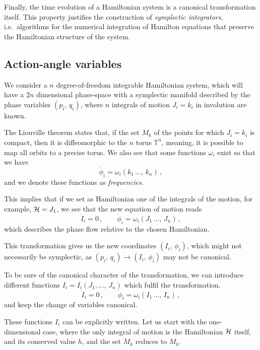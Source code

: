 Finally, the time evolution of a Hamiltonian system is a canonical transformation itself. This property justifies the construction of \textit{symplectic integrators}, i.e.\ algorithms for the numerical integration of Hamilton equations that preserve the Hamiltonian structure of the system.


\subsection{Action-angle variables}

We consider a $n$ degree-of-freedom integrable Hamiltonian system, which will have a $2n$ dimensional phase-space with a symplectic manifold described by the phase variables $(p_i,\,q_i)$, where $n$ integrals of motion $J_i=k_i$ in involution are known.

The Liouville theorem states that, if the set $M_{k}$ of the points for which $J_i=k_i$ is compact, then it is diffeomorphic to the $n$ torus $\mathbb{T}^n$, meaning, it is possible to map all orbits to a precise torus. We also see that some functions $\omega_i$ exist so that we have
\begin{equation}
    \dot{\phi}_i = \omega_i(k_1\,\dots,\,k_n)\,, 
\end{equation}
and we denote these functions as \textit{frequencies}.

This implies that if we set as Hamiltonian one of the integrals of the motion, for example, $\mathcal{H}=J_1$, we see that the new equation of motion reads
\begin{equation} 
    \dot I_i = 0\,, \qquad \dot \phi_i = \omega_i(J_1\,\dots,\,J_n) \,,
\end{equation} 
which describes the phase flow relative to the chosen Hamiltonian.

This transformation gives us the new coordinates $(I_i,\,\phi_i)$, which might not necessarily be symplectic, as $(p_i,\,q_i)\to(I_i,\,\phi_i)$ may not be canonical.

To be sure of the canonical character of the transformation, we can introduce different functions $I_i = I_i(J_1,\dots,\,J_n)$ which fulfil the transformation.
%
\begin{equation}
    \dot I_i = 0\,, \qquad \dot \phi_i = \omega_i(I_1\,\dots,\,I_n)\,,
\end{equation} 
%
and keep the change of variables canonical.

These functions $I_i$ can be explicitly written. Let us start with the one-di\-men\-sio\-nal case, where the only integral of motion is the Hamiltonian $\mathcal{H}$ itself, and its conserved value $h$, and the set $M_k$ reduces to $M_h$.

